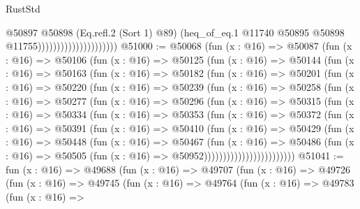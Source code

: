 \begin{lexlean}{RustStd}
\begin{coremodule}
                                          @50897
                                            @50898
                                            (Eq.refl.{2} (Sort 1) @89)
                                            (heq_of_eq.{1}
                                              @11740
                                              @50895
                                              @50898
                                              @11755)))))))))))))))))))))
@51000 := @50068
    (fun (x : @16) =>
    @50087
      (fun (x : @16) =>
      @50106
        (fun (x : @16) =>
        @50125
          (fun (x : @16) =>
          @50144
            (fun (x : @16) =>
            @50163
              (fun (x : @16) =>
              @50182
                (fun (x : @16) =>
                @50201
                  (fun (x : @16) =>
                  @50220
                    (fun (x : @16) =>
                    @50239
                      (fun (x : @16) =>
                      @50258
                        (fun (x : @16) =>
                        @50277
                          (fun (x : @16) =>
                          @50296
                            (fun (x : @16) =>
                            @50315
                              (fun (x : @16) =>
                              @50334
                                (fun (x : @16) =>
                                @50353
                                  (fun (x : @16) =>
                                  @50372
                                    (fun (x : @16) =>
                                    @50391
                                      (fun (x : @16) =>
                                      @50410
                                        (fun (x : @16) =>
                                        @50429
                                          (fun (x : @16) =>
                                          @50448
                                            (fun (x : @16) =>
                                            @50467
                                              (fun (x : @16) =>
                                              @50486
                                                (fun (x : @16) =>
                                                @50505
                                                  (fun (x : @16) => @50952))))))))))))))))))))))))
@51041 := fun (x : @16) =>
  @49688
    (fun (x : @16) =>
    @49707
      (fun (x : @16) =>
      @49726
        (fun (x : @16) =>
        @49745
          (fun (x : @16) =>
          @49764
            (fun (x : @16) =>
            @49783
              (fun (x : @16) =>

\end{coremodule}
\end{lexlean}
